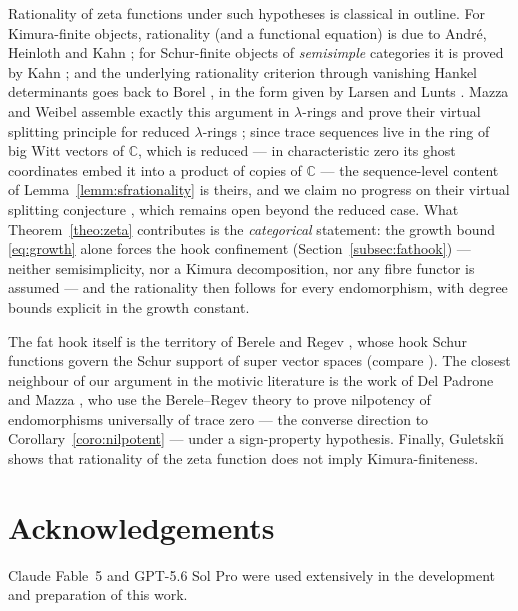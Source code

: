 \documentclass[11pt]{article}
\begin{document}
Rationality of zeta functions under such hypotheses is classical
in outline. For Kimura-finite objects, rationality (and a
functional equation) is due to Andr\'e, Heinloth and Kahn
\cite{And04,Hei07,Kah09}; for Schur-finite objects of
\emph{semisimple} categories it is proved by Kahn
\cite[Part~I]{Kah09}; and the underlying rationality criterion
through vanishing Hankel determinants goes back to Borel
\cite{Bor1894}, in the form given by Larsen and Lunts
\cite[\S2]{LL04}. Mazza and Weibel assemble exactly this argument
in $\lambda$-rings and prove their virtual splitting principle
for reduced $\lambda$-rings \cite[Prop.~4.14,
Cor.~4.15]{MW13}; since trace sequences live in the ring of big
Witt vectors of $\mathbb{C}$, which is reduced --- in
characteristic zero its ghost coordinates embed it into a product
of copies of $\mathbb{C}$ --- the sequence-level content
of Lemma~\ref{lemm:sfrationality} is theirs, and we claim no
progress on their virtual splitting conjecture
\cite[Conj.~4.12]{MW13}, which remains open beyond the reduced
case. What Theorem~\ref{theo:zeta} contributes is the
\emph{categorical} statement: the growth bound
\eqref{eq:growth} alone forces the hook confinement
(Section~\ref{subsec:fathook}) --- neither semisimplicity, nor a
Kimura decomposition, nor any fibre functor is assumed --- and
the rationality then follows for every endomorphism, with degree
bounds explicit in the growth constant.

The fat hook itself is the territory of Berele and Regev
\cite{BR87}, whose hook Schur functions govern the Schur support
of super vector spaces (compare \cite[Cor.~1.9]{Del02}). The
closest neighbour of our argument in the motivic literature is
the work of Del Padrone and Mazza \cite{DPM05,DPM09}, who use the
Berele--Regev theory to prove nilpotency of endomorphisms
universally of trace zero --- the converse direction to
Corollary~\ref{coro:nilpotent} --- under a sign-property
hypothesis. Finally, Guletski\u{\i}
\cite{Gul10} shows that rationality of the zeta function does not
imply Kimura-finiteness.

\section*{Acknowledgements}

Claude Fable~5 and GPT-5.6 Sol Pro were used extensively in the
development and preparation of this work.



\end{document}
